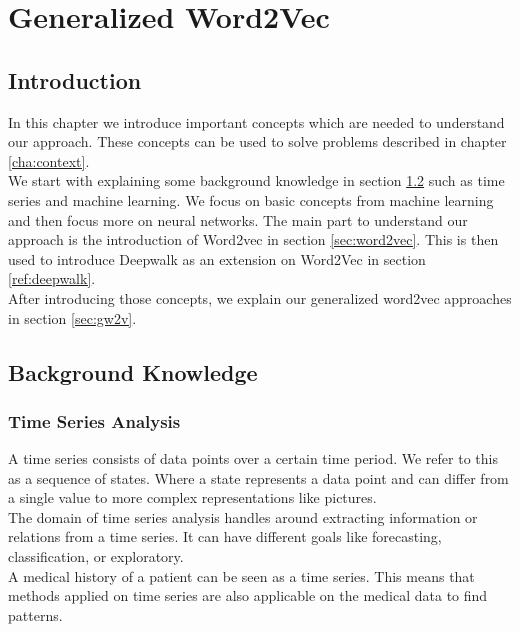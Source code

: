 \graphicspath{ {Background/Images/} }


\chapter{Generalized Word2Vec}
\label{cha:background}

\section{Introduction}
In this chapter we introduce important concepts which are needed to understand our approach. These concepts can be used to solve problems described in chapter \ref{cha:context}. \\

We start with explaining some background knowledge in section \ref{sec:bk} such as time series and machine learning. We focus on basic concepts from machine learning and then focus more on neural networks. The main part to understand our approach is the introduction of Word2vec in section \ref{sec:word2vec}. This is then used to introduce Deepwalk as an extension on Word2Vec in section \ref{ref:deepwalk}. \\

After introducing those concepts, we explain our generalized word2vec approaches in section \ref{sec:gw2v}.


\section{Background Knowledge}
\label{sec:bk}

	\subsection{Time Series Analysis}
A time series consists of data points over a certain time period. We refer to this as a sequence of states. Where a state represents a data point and can differ from a single value to more complex representations like pictures. \\
The domain of time series analysis handles around extracting information or relations from a time series. It can have different goals like forecasting, classification, or exploratory. \\

A medical history of a patient can be seen as a time series. This means that methods applied on time series are also applicable on the medical data to find patterns.

